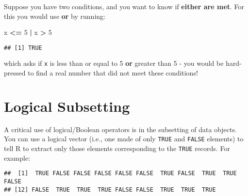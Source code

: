 \documentclass[]{book}
\newenvironment{Shaded}{\begin{snugshade}}{\end{snugshade}}
\newcommand{\DecValTok}[1]{\textcolor[rgb]{0.00,0.00,0.81}{#1}}
\newcommand{\StringTok}[1]{\textcolor[rgb]{0.31,0.60,0.02}{#1}}
\newcommand{\CommentTok}[1]{\textcolor[rgb]{0.56,0.35,0.01}{\textit{#1}}}
\newcommand{\OperatorTok}[1]{\textcolor[rgb]{0.81,0.36,0.00}{\textbf{#1}}}
\newcommand{\NormalTok}[1]{#1}
\theoremstyle{definition}
\theoremstyle{definition}
\theoremstyle{definition}
\theoremstyle{remark}
\begin{document}
Suppose you have two conditions, and you want to know if \textbf{either
are met}. For this you would use \textbf{or} by running:

\begin{Shaded}
\begin{Highlighting}[]
\NormalTok{x }\OperatorTok{<=}\StringTok{ }\DecValTok{5} \OperatorTok{|}\StringTok{ }\NormalTok{x }\OperatorTok{>}\StringTok{ }\DecValTok{5}
\end{Highlighting}
\end{Shaded}

\begin{verbatim}
## [1] TRUE
\end{verbatim}

which asks if \texttt{x} is less than or equal to 5 \textbf{or} greater
than 5 - you would be hard-pressed to find a real number that did not
meet these conditions!

\section{Logical Subsetting}\label{logsub}

A critical use of logical/Boolean operators is in the subsetting of data
objects. You can use a logical vector (i.e., one made of only
\texttt{TRUE} and \texttt{FALSE} elements) to tell R to extract only
those elements corresponding to the \texttt{TRUE} records. For example:

\begin{Shaded}
\end{Shaded}

\begin{verbatim}
##  [1]  TRUE FALSE FALSE FALSE FALSE FALSE  TRUE FALSE  TRUE  TRUE FALSE
## [12] FALSE  TRUE  TRUE  TRUE FALSE FALSE  TRUE  TRUE  TRUE
\end{verbatim}

\begin{Shaded}
\end{Shaded}
\end{document}
